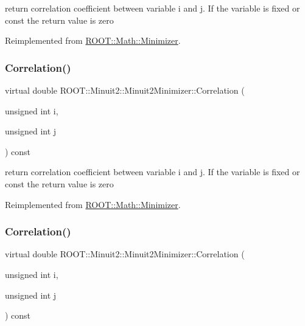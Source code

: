 return correlation coefficient between variable i and j. If the variable is fixed or const the return value is zero 

Reimplemented from \mbox{\hyperlink{classROOT_1_1Math_1_1Minimizer_a9ba2f4bc3c8c0e905f2c018e79809c0e}{R\+O\+O\+T\+::\+Math\+::\+Minimizer}}.

\mbox{\label{classROOT_1_1Minuit2_1_1Minuit2Minimizer_a229e82025189e72b5a03cb4e3be19f4a}} 
\subsubsection{\texorpdfstring{Correlation()}{Correlation()}\hspace{0.1cm}{\footnotesize\ttfamily [2/3]}}
{\footnotesize\ttfamily virtual double R\+O\+O\+T\+::\+Minuit2\+::\+Minuit2\+Minimizer\+::\+Correlation (\begin{DoxyParamCaption}\item[{unsigned int}]{i,  }\item[{unsigned int}]{j }\end{DoxyParamCaption}) const\hspace{0.3cm}{\ttfamily [virtual]}}

return correlation coefficient between variable i and j. If the variable is fixed or const the return value is zero 

Reimplemented from \mbox{\hyperlink{classROOT_1_1Math_1_1Minimizer_a9ba2f4bc3c8c0e905f2c018e79809c0e}{R\+O\+O\+T\+::\+Math\+::\+Minimizer}}.

\mbox{\label{classROOT_1_1Minuit2_1_1Minuit2Minimizer_a229e82025189e72b5a03cb4e3be19f4a}} 
\subsubsection{\texorpdfstring{Correlation()}{Correlation()}\hspace{0.1cm}{\footnotesize\ttfamily [3/3]}}
{\footnotesize\ttfamily virtual double R\+O\+O\+T\+::\+Minuit2\+::\+Minuit2\+Minimizer\+::\+Correlation (\begin{DoxyParamCaption}\item[{unsigned int}]{i,  }\item[{unsigned int}]{j }\end{DoxyParamCaption}) const\hspace{0.3cm}{\ttfamily [virtual]}}

